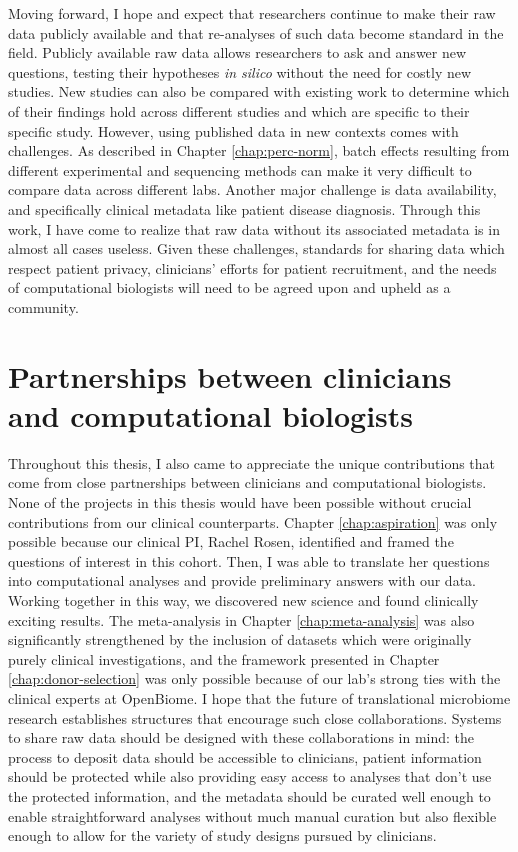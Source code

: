 Moving forward, I hope and expect that researchers continue to make their raw data publicly available and that re-analyses of such data become standard in the field.
Publicly available raw data allows researchers to ask and answer new questions, testing their hypotheses \textit{in silico} without the need for costly new studies.
New studies can also be compared with existing work to determine which of their findings hold across different studies and which are specific to their specific study.
However, using published data in new contexts comes with challenges.
As described in Chapter \ref{chap:perc-norm}, batch effects resulting from different experimental and sequencing methods can make it very difficult to compare data across different labs.
Another major challenge is data availability, and specifically clinical metadata like patient disease diagnosis.
Through this work, I have come to realize that raw data without its associated metadata is in almost all cases useless.
Given these challenges, standards for sharing data which respect patient privacy, clinicians' efforts for patient recruitment, and the needs of computational biologists will need to be agreed upon and upheld as a community.

\section{Partnerships between clinicians and computational biologists}

Throughout this thesis, I also came to appreciate the unique contributions that come from close partnerships between clinicians and computational biologists.
None of the projects in this thesis would have been possible without crucial contributions from our clinical counterparts.
Chapter \ref{chap:aspiration} was only possible because our clinical PI, Rachel Rosen, identified and framed the questions of interest in this cohort.
Then, I was able to translate her questions into computational analyses and provide preliminary answers with our data.
Working together in this way, we discovered new science and found clinically exciting results.
The meta-analysis in Chapter \ref{chap:meta-analysis} was also significantly strengthened by the inclusion of datasets which were originally purely clinical investigations, and the framework presented in Chapter \ref{chap:donor-selection} was only possible because of our lab's strong ties with the clinical experts at OpenBiome.
I hope that the future of translational microbiome research establishes structures that encourage such close collaborations.
Systems to share raw data should be designed with these collaborations in mind: the process to deposit data should be accessible to clinicians, patient information should be protected while also providing easy access to analyses that don't use the protected information, and the metadata should be curated well enough to enable straightforward analyses without much manual curation but also flexible enough to allow for the variety of study designs pursued by clinicians.

